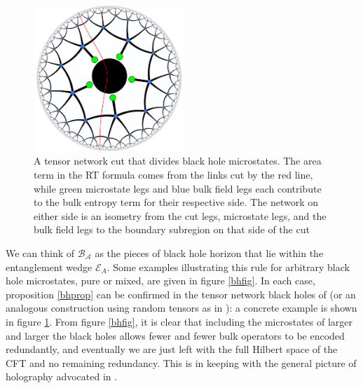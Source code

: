 \documentclass[12pt]{article}
\newcommand{\bfig}{\begin{figure}\begin{center}}
\newcommand{\efig}{\end{center}\end{figure}}
\newcommand{\EA}{\mathcal{E}_A}
\begin{document}
\bfig
\includegraphics[height=5.5cm]{cutblackhole.pdf}
\caption{A tensor network cut that divides black hole microstates. The area term in the RT formula comes from the links cut by the red line, while green microstate legs and blue bulk field legs each contribute to the bulk entropy term for their respective side.  The network on either side is an isometry from the cut legs, microstate legs, and the bulk field legs to the boundary subregion on that side of the cut}\label{cutbh}
\efig
We can think of $\mathcal{B_A}$ as the pieces of black hole horizon that lie within the entanglement wedge $\EA$.  Some examples illustrating this rule for arbitrary black hole microstates, pure or mixed, are given in figure \ref{bhfig}.  In each case, proposition \ref{bhprop} can be confirmed in the tensor network black holes of \cite{Pastawski:2015qua} (or an analogous construction using random tensors as in \cite{Hayden:2016cfa}): a concrete example is shown in figure \ref{cutbh}.
From figure \ref{bhfig}, it is clear that including the microstates of larger and larger the black holes allows fewer and fewer bulk operators to be encoded redundantly, and eventually we are just left with the full Hilbert space of the CFT and no remaining redundancy.  This is in keeping with the general picture of holography advocated in \cite{Almheiri:2014lwa}.
\end{document}
